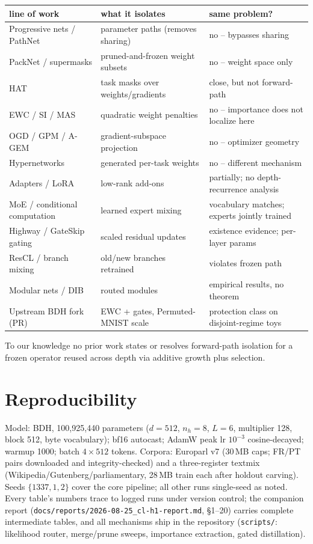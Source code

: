 \documentclass[11pt]{article}
\theoremstyle{remark}\newtheorem{remark}{Remark}
\begin{document}
\begin{table}[h]
\centering\small
\begin{tabular}{p{3.4cm}p{4.1cm}l}
\toprule
line of work & what it isolates & same problem? \\
\midrule
Progressive nets / PathNet & parameter paths (removes sharing) & no -- bypasses sharing \\
PackNet / supermasks & pruned-and-frozen weight subsets & no -- weight space only \\
HAT & task masks over weights/gradients & close, but not forward-path \\
EWC / SI / MAS & quadratic weight penalties & no -- importance does not localize here \\
OGD / GPM / A-GEM & gradient-subspace projection & no -- optimizer geometry \\
Hypernetworks & generated per-task weights & no -- different mechanism \\
Adapters / LoRA & low-rank add-ons & partially; no depth-recurrence analysis \\
MoE / conditional computation & learned expert mixing & vocabulary matches; experts jointly trained \\
Highway / GateSkip gating & scaled residual updates & existence evidence; per-layer params \\
ResCL / branch mixing & old/new branches retrained & violates frozen path \\
Modular nets / DIB & routed modules & empirical results, no theorem \\
Upstream BDH fork (PR) & EWC + gates, Permuted-MNIST scale & protection class on disjoint-regime toys \\
\bottomrule
\end{tabular}
\end{table}

\noindent To our knowledge no prior work states or resolves forward-path isolation for a
frozen operator reused across depth via additive growth plus selection.

\section{Reproducibility}
Model: BDH, 100{,}925{,}440 parameters ($d{=}512$, $n_h{=}8$, $L{=}6$, multiplier 128,
block 512, byte vocabulary); bf16 autocast; AdamW peak lr $10^{-3}$ cosine-decayed; warmup
1000; batch $4\times512$ tokens. Corpora: Europarl v7 (30\,MB caps; FR/PT pairs downloaded
and integrity-checked) and a three-register textmix (Wikipedia/Gutenberg/parliamentary,
28\,MB train each after holdout carving). Seeds $\{1337,1,2\}$ cover the core pipeline;
all other runs single-seed as noted. Every table's numbers trace to logged runs under
version control; the companion report (\texttt{docs/reports/2026-08-25\_cl-h1-report.md},
\S1--20) carries complete intermediate tables, and all mechanisms ship in the repository
(\texttt{scripts/}: likelihood router, merge/prune sweeps, importance extraction, gated
distillation).
\end{document}
